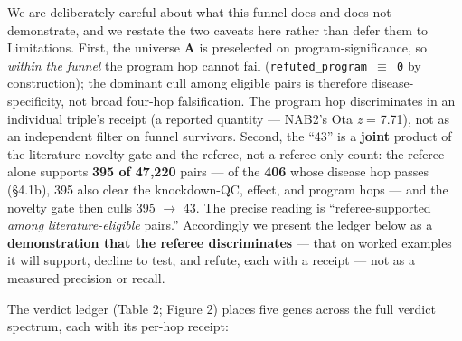 We are deliberately careful about what this funnel does and does not demonstrate, and we restate the two
caveats here rather than defer them to Limitations. First, the universe \textbf{A} is preselected on
program-significance, so \emph{within the funnel} the program hop cannot fail (\texttt{refuted\_program\ $\equiv$\ 0} by
construction); the dominant cull among eligible pairs is therefore disease-specificity, not broad four-hop
falsification. The program hop discriminates in an individual triple's receipt (a reported quantity --- NAB2's
Ota \emph{z} = 7.71), not as an independent filter on funnel survivors. Second, the ``43'' is a \textbf{joint} product
of the literature-novelty gate and the referee, not a referee-only count: the referee alone supports
\textbf{395 of 47,220} pairs --- of the \textbf{406} whose disease hop passes (\S{}4.1b), 395 also clear the
knockdown-QC, effect, and program hops --- and the novelty gate then culls 395 $\rightarrow$ 43. The precise reading is ``referee-supported
\emph{among literature-eligible} pairs.'' Accordingly we present the ledger below as a \textbf{demonstration that the
referee discriminates} --- that on worked examples it will support, decline to test, and refute, each with a
receipt --- not as a measured precision or recall.

The verdict ledger (Table 2; Figure 2) places five genes across the full verdict spectrum, each with its per-hop
receipt:

